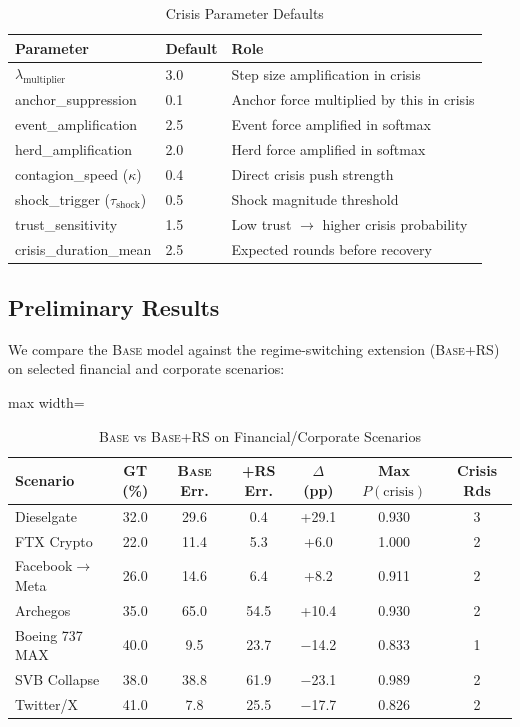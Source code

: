\documentclass[12pt]{article}
\begin{document}
\begin{table}[H]
\centering
\caption{Crisis Parameter Defaults}
\label{tab:crisis_params}
\begin{tabular}{lll}
\toprule
Parameter & Default & Role \\
\midrule
$\lambda_{\text{multiplier}}$ & 3.0 & Step size amplification in crisis \\
anchor\_suppression & 0.1 & Anchor force multiplied by this in crisis \\
event\_amplification & 2.5 & Event force amplified in softmax \\
herd\_amplification & 2.0 & Herd force amplified in softmax \\
contagion\_speed ($\kappa$) & 0.4 & Direct crisis push strength \\
shock\_trigger ($\tau_{\text{shock}}$) & 0.5 & Shock magnitude threshold \\
trust\_sensitivity & 1.5 & Low trust $\to$ higher crisis probability \\
crisis\_duration\_mean & 2.5 & Expected rounds before recovery \\
\bottomrule
\end{tabular}
\end{table}

\subsection{Preliminary Results}

We compare the \textsc{Base} model against the regime-switching extension (\textsc{Base}+RS) on selected financial and corporate scenarios:

\begin{table}[H]
\centering
\caption{\textsc{Base} vs \textsc{Base}+RS on Financial/Corporate Scenarios}
\label{tab:v2v3}
\begin{adjustbox}{max width=\textwidth}
\begin{tabular}{@{}lcccccc@{}}
\toprule
Scenario & GT (\%) & \textsc{Base} Err. & +RS Err. & $\Delta$ (pp) & Max $P(\text{crisis})$ & Crisis Rds \\
\midrule
Dieselgate & 32.0 & 29.6 & 0.4 & +29.1 & 0.930 & 3 \\
FTX Crypto & 22.0 & 11.4 & 5.3 & +6.0 & 1.000 & 2 \\
Facebook$\to$Meta & 26.0 & 14.6 & 6.4 & +8.2 & 0.911 & 2 \\
Archegos & 35.0 & 65.0 & 54.5 & +10.4 & 0.930 & 2 \\
Boeing 737 MAX & 40.0 & 9.5 & 23.7 & $-$14.2 & 0.833 & 1 \\
SVB Collapse & 38.0 & 38.8 & 61.9 & $-$23.1 & 0.989 & 2 \\
Twitter/X & 41.0 & 7.8 & 25.5 & $-$17.7 & 0.826 & 2 \\
\bottomrule
\end{tabular}
\end{adjustbox}
\end{table}
\end{document}

